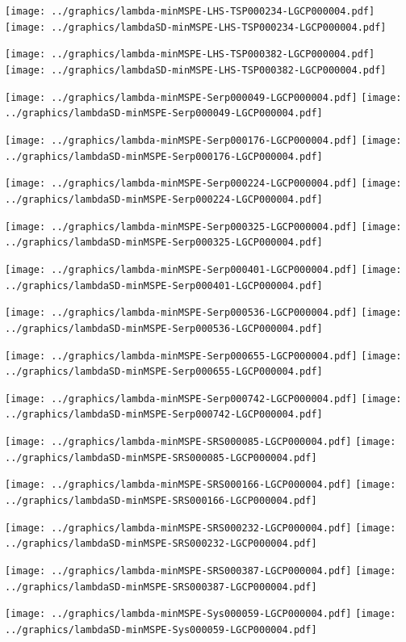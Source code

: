 \documentclass[review]{elsarticle}
\begin{document}
\texttt{[image: ../graphics/lambda-minMSPE-LHS-TSP000234-LGCP000004.pdf]}
\texttt{[image: ../graphics/lambdaSD-minMSPE-LHS-TSP000234-LGCP000004.pdf]}

\texttt{[image: ../graphics/lambda-minMSPE-LHS-TSP000382-LGCP000004.pdf]}
\texttt{[image: ../graphics/lambdaSD-minMSPE-LHS-TSP000382-LGCP000004.pdf]}

\texttt{[image: ../graphics/lambda-minMSPE-Serp000049-LGCP000004.pdf]}
\texttt{[image: ../graphics/lambdaSD-minMSPE-Serp000049-LGCP000004.pdf]}

\texttt{[image: ../graphics/lambda-minMSPE-Serp000176-LGCP000004.pdf]}
\texttt{[image: ../graphics/lambdaSD-minMSPE-Serp000176-LGCP000004.pdf]}

\texttt{[image: ../graphics/lambda-minMSPE-Serp000224-LGCP000004.pdf]}
\texttt{[image: ../graphics/lambdaSD-minMSPE-Serp000224-LGCP000004.pdf]}

\texttt{[image: ../graphics/lambda-minMSPE-Serp000325-LGCP000004.pdf]}
\texttt{[image: ../graphics/lambdaSD-minMSPE-Serp000325-LGCP000004.pdf]}

\texttt{[image: ../graphics/lambda-minMSPE-Serp000401-LGCP000004.pdf]}
\texttt{[image: ../graphics/lambdaSD-minMSPE-Serp000401-LGCP000004.pdf]}

\texttt{[image: ../graphics/lambda-minMSPE-Serp000536-LGCP000004.pdf]}
\texttt{[image: ../graphics/lambdaSD-minMSPE-Serp000536-LGCP000004.pdf]}

\texttt{[image: ../graphics/lambda-minMSPE-Serp000655-LGCP000004.pdf]}
\texttt{[image: ../graphics/lambdaSD-minMSPE-Serp000655-LGCP000004.pdf]}

\texttt{[image: ../graphics/lambda-minMSPE-Serp000742-LGCP000004.pdf]}
\texttt{[image: ../graphics/lambdaSD-minMSPE-Serp000742-LGCP000004.pdf]}

\texttt{[image: ../graphics/lambda-minMSPE-SRS000085-LGCP000004.pdf]}
\texttt{[image: ../graphics/lambdaSD-minMSPE-SRS000085-LGCP000004.pdf]}

\texttt{[image: ../graphics/lambda-minMSPE-SRS000166-LGCP000004.pdf]}
\texttt{[image: ../graphics/lambdaSD-minMSPE-SRS000166-LGCP000004.pdf]}

\texttt{[image: ../graphics/lambda-minMSPE-SRS000232-LGCP000004.pdf]}
\texttt{[image: ../graphics/lambdaSD-minMSPE-SRS000232-LGCP000004.pdf]}

\texttt{[image: ../graphics/lambda-minMSPE-SRS000387-LGCP000004.pdf]}
\texttt{[image: ../graphics/lambdaSD-minMSPE-SRS000387-LGCP000004.pdf]}

\texttt{[image: ../graphics/lambda-minMSPE-Sys000059-LGCP000004.pdf]}
\texttt{[image: ../graphics/lambdaSD-minMSPE-Sys000059-LGCP000004.pdf]}
\end{document}
